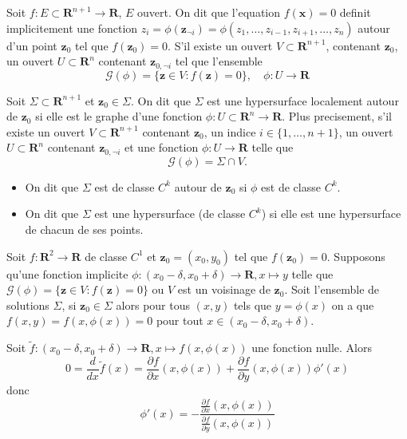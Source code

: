 \begin{definition}
Soit $f:E\subset \mathbf{R}^{n+1}\to \mathbf{R}$, $E$ ouvert. On dit que l'equation $f(\boldsymbol{x})=0$ definit implicitement une fonction $z_{i}=\phi(\boldsymbol{z}_{\neg i})=\phi(z_{1},\dots,z_{i-1},z_{i+1},\dots,z_{n})$  autour d'un point $\boldsymbol{z}_{0}$ tel que $f(\boldsymbol{z}_{0})=0$. S'il existe un ouvert $V\subset \mathbf{R}^{n+1}$, contenant $\boldsymbol{z}_{0}$, un ouvert $U\subset \mathbf{R}^{n}$ contenant $\boldsymbol{z}_{0,\neg i}$ tel que l'ensemble
$$
\mathcal{G}(\phi)=\{ \boldsymbol{z}\in V:f(\boldsymbol{z})=0 \},\quad \phi:U\to \mathbf{R}
$$\end{definition}
\begin{definition}
Soit $\Sigma \subset \mathbf{R}^{n+1}$ et $\boldsymbol{z}_{0}\in \Sigma$. On dit que $\Sigma$ est une hypersurface localement autour de $\boldsymbol{z}_{0}$ si elle est le graphe d'une fonction $\phi:U\subset \mathbf{R}^{n}\to \mathbf{R}$. Plus precisement, s'il existe un ouvert $V\subset \mathbf{R}^{n+1}$ contenant $\boldsymbol{z}_{0}$, un indice $i\in \{ 1,\dots,n+1 \}$, un ouvert $U\subset \mathbf{R}^{n}$ contenant $\boldsymbol{z}_{0,\neg i}$ et une fonction $\phi:U\to \mathbf{R}$ telle que 
$$
\mathcal{G}(\phi)=\Sigma \cap V.
$$
\begin{itemize}
\item On dit que $\Sigma$ est de classe $C^{k}$ autour de $\boldsymbol{z}_{0}$ si $\phi$ est de classe $C^{k}$.
\item On dit que $\Sigma$ est une hypersurface (de classe $C^{k}$) si elle est une hypersurface de chacun de ses points.
\end{itemize}
\end{definition}

Soit $f:\mathbf{R}^{2}\to \mathbf{R}$ de classe $C^{1}$ et $\boldsymbol{z}_{0}=(x_{0},y_{0})$ tel que $f(\boldsymbol{z}_{0})=0$. Supposons qu'une fonction implicite $\phi:(x_{0}-\delta,x_{0}+\delta)\to \mathbf{R},x\mapsto y$ telle que $\mathcal{G}(\phi)=\{ \boldsymbol{z}\in V:f(\boldsymbol{z})=0 \}$ ou $V$ est un voisinage de $\boldsymbol{z}_{0}$. Soit l'ensemble de solutions $\Sigma$, si $\boldsymbol{z}_{0}\in\Sigma$ alors pour tous $(x,y)$ tels que $y=\phi (x)$ on a que $f(x,y)=f(x,\phi(x))=0$ pour tout $x \in(x_{0}-\delta,x_{0}+\delta)$.

Soit $\tilde{f}:(x_{0}-\delta,x_{0}+\delta)\to \mathbf{R},x \mapsto f(x,\phi(x))$ une fonction nulle. Alors
$$
0=\frac{d}{dx}\tilde{f}(x)=\frac{ \partial f }{ \partial x } (x,\phi (x))+\frac{ \partial f }{ \partial y } (x,\phi(x))\phi'(x)
$$
donc
$$
\phi'(x)=- \frac{\frac{ \partial f }{ \partial x } (x,\phi(x))}{\frac{ \partial f }{ \partial y } (x,\phi (x))}
$$


